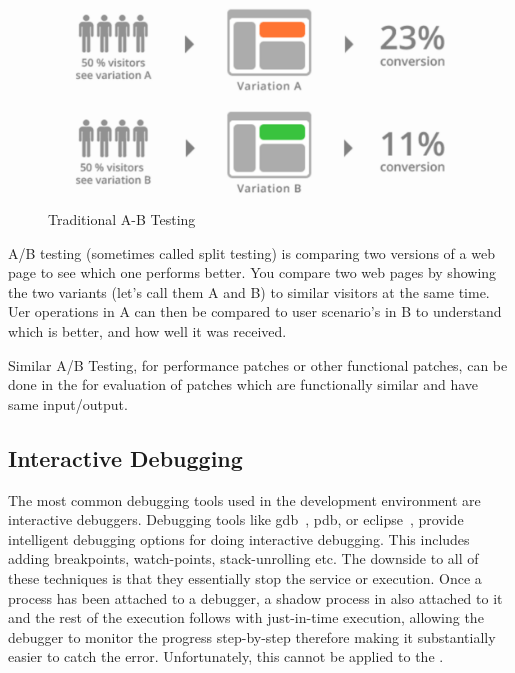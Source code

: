 \begin{figure}[h!]
	
	\centering
	\includegraphics[width=0.99\textwidth]{guided/figs/ABTesting.pdf}
	\caption{Traditional A-B Testing}
	\label{fig:abTesting}
\end{figure}

A/B testing (sometimes called split testing) is comparing two versions of a web page to see which one performs better. 
You compare two web pages by showing the two variants (let's call them A and B) to similar visitors at the same time.
Uer operations in A can then be compared to user scenario's in B to understand which is better, and how well it was received.

Similar A/B Testing, for performance patches or other functional patches, can be done in the \debugcontainer for evaluation of patches which are functionally similar and have same input/output.


\subsection{Interactive Debugging}

The most common debugging tools used in the development environment are interactive debuggers. 
Debugging tools like gdb~\cite{gdb}, pdb, or eclipse~\cite{eclipse}, provide intelligent debugging options for doing interactive debugging. 
This includes adding breakpoints, watch-points, stack-unrolling etc.
The downside to all of these techniques is that they essentially stop the service or execution.
Once a process has been attached to a debugger, a shadow process in also attached to it and the rest of the execution follows with just-in-time execution, allowing the debugger to monitor the progress step-by-step therefore making it substantially easier to catch the error.
Unfortunately, this cannot be applied to the \productioncontainer.

